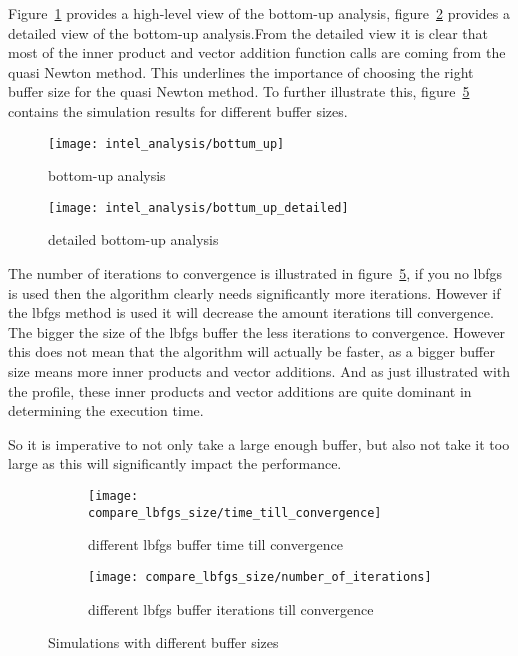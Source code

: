 Figure~\ref{fig:bottom-up analysis} provides a high-level view of the bottom-up analysis, figure~\ref{fig:detailed bottom-up analysis} provides a detailed view of the bottom-up analysis.From the detailed view it is clear that most of the inner product and vector addition function calls are coming from the quasi Newton method. This underlines the importance of choosing the right buffer size for the quasi Newton method. To further illustrate this, figure~\ref{fig:Simulations with different buffer sizes} contains the simulation results for different buffer sizes.

\begin{figure}[H]
	\centering
	\texttt{[image: intel\_analysis/bottum\_up]}
	\caption{bottom-up analysis}
	\label{fig:bottom-up analysis}
\end{figure}

\begin{figure}[H]
	\centering
	\texttt{[image: intel\_analysis/bottum\_up\_detailed]}
	\caption{detailed bottom-up analysis}
	\label{fig:detailed bottom-up analysis}
\end{figure}

The number of iterations to convergence is illustrated in figure~\ref{fig:Simulations with different buffer sizes}, if you no lbfgs is used then the algorithm clearly needs significantly more iterations. However if the lbfgs method is used it will decrease the amount iterations till convergence. The bigger the size of the lbfgs buffer the less iterations to convergence. However this does not mean that the algorithm will actually be faster, as a bigger buffer size means more inner products and vector additions. And as just illustrated with the profile, these inner products and vector additions are quite dominant in determining the execution time.

So it is imperative to not only take a large enough buffer, but also not take it too large as this will significantly impact the performance.

\begin{figure}[H]
	\centering
	\begin{subfigure}[b]{0.45\textwidth}
		\centering
		\texttt{[image: compare\_lbfgs\_size/time\_till\_convergence]}
		\caption{different lbfgs buffer time till convergence}
		\label{fig:different lbfgs buffer time till convergence}
	\end{subfigure}
	\hfill
	\begin{subfigure}[b]{0.45\textwidth}
		\centering
		\texttt{[image: compare\_lbfgs\_size/number\_of\_iterations]}
		\caption{different lbfgs buffer iterations till convergence}
		\label{fig:different lbfgs buffer iterations till convergence}
	\end{subfigure}
	\caption{Simulations with different buffer sizes}
	\label{fig:Simulations with different buffer sizes}
\end{figure}

